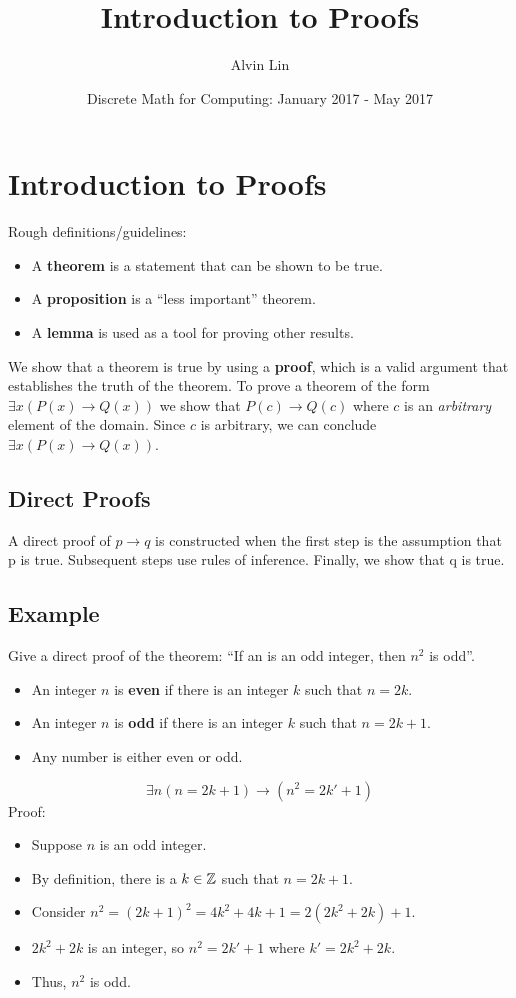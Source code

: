 \documentclass{math}
\title{Introduction to Proofs}
\author{Alvin Lin}
\date{Discrete Math for Computing: January 2017 - May 2017}
\begin{document}
\maketitle

\section*{Introduction to Proofs}
Rough definitions/guidelines:
\begin{itemize}
  \item A \textbf{theorem} is a statement that can be shown to be true.
  \item A \textbf{proposition} is a ``less important'' theorem.
  \item A \textbf{lemma} is used as a tool for proving other results.
\end{itemize}
We show that a theorem is true by using a \textbf{proof}, which is a valid
argument that establishes the truth of the theorem. To prove a theorem
of the form \( \exists{x}(P(x) \to Q(x)) \) we show that \( P(c) \to Q(c) \)
where \( c \) is an \textit{arbitrary} element of the domain. Since \( c \)
is arbitrary, we can conclude \( \exists{x}(P(x) \to Q(x)) \).

\subsection*{Direct Proofs}
A direct proof of \( p \to q \) is constructed when the first step is the
assumption that p is true. Subsequent steps use rules of inference. Finally,
we show that q is true.

\subsection*{Example}
Give a direct proof of the theorem: ``If an is an odd integer, then \( n^{2} \)
is odd''.
\begin{itemize}
  \item An integer \( n \) is \textbf{even} if there is an integer \( k \) such
  that \( n = 2k \).
  \item An integer \( n \) is \textbf{odd} if there is an integer \( k \) such
  that \( n = 2k+1 \).
  \item Any number is either even or odd.
\end{itemize}
\[ \exists{n}(n = 2k+1) \to (n^{2} = 2k'+1) \]
Proof:
\begin{itemize}
  \item Suppose \( n \) is an odd integer.
  \item By definition, there is a \( k \in \mathbb{Z} \) such that \( n = 2k+1 \).
  \item Consider \( n^{2} = (2k+1)^{2} = 4k^{2}+4k+1 = 2(2k^{2}+2k)+1 \).
  \item \( 2k^{2}+2k \) is an integer, so \( n^{2} = 2k'+1 \) where
    \( k' = 2k^{2}+2k \).
  \item Thus, \( n^{2} \) is odd.
\end{itemize}
\end{document}
